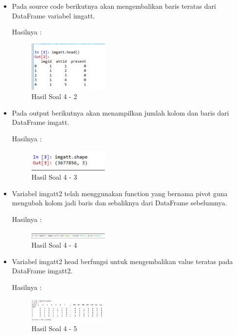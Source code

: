 \begin{enumerate}
\begin{itemize}
\item Pada source code berikutnya akan mengembalikan baris teratas dari DataFrame variabel imgatt.

Hasilnya :
\begin{figure}[H]
	\centering
		\includegraphics[width=4cm]{figures/1174054/3/8.png}
		\caption{Hasil Soal 4 - 2}
\end{figure}
		
\item Pada output berikutnya akan menampilkan jumlah kolom dan baris dari DataFrame imgatt. 

Hasilnya :
\begin{figure}[H]
	\centering
		\includegraphics[width=4cm]{figures/1174054/3/9.png}
		\caption{Hasil Soal 4 - 3}
\end{figure}
		
\item Variabel imgatt2 telah menggunakan function yang bernama pivot guna mengubah kolom jadi baris dan sebaliknya dari DataFrame sebelumnya.

Hasilnya :
\begin{figure}[H]
	\centering
		\includegraphics[width=4cm]{figures/1174054/3/10.png}
		\caption{Hasil Soal 4 - 4}
\end{figure}
		
\item Variabel imgatt2 head berfungsi untuk mengembalikan value teratas pada DataFrame imgatt2.

Hasilnya :
\begin{figure}[H]
	\centering
		\includegraphics[width=4cm]{figures/1174054/3/11.png}
		\caption{Hasil Soal 4 - 5}
\end{figure}
		

\end{itemize}
\end{enumerate}
